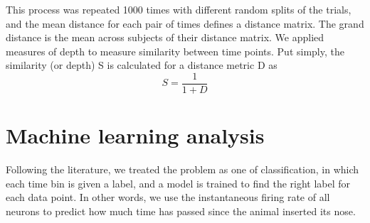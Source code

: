 This process was repeated 1000 times with different random splits of the trials, and the mean distance for each pair of times defines a distance matrix. The grand distance is the mean across subjects of their distance matrix. We applied measures of depth \cite{mosler2013depth} to measure similarity between time points. Put simply, the similarity (or depth) S is calculated for a distance metric D as 
\begin{equation*}
S = \frac{1}{1+D}
\label{eqn:depth}
\end{equation*}



\section{Machine learning analysis}

Following the literature\cite{bakhurin2017differential}, we treated the problem as one of classification, in which each time bin is given a label, and a model is trained to find the right label for each data point. In other words, we use the instantaneous firing rate of all neurons to predict how much time has passed since the animal inserted its nose.

